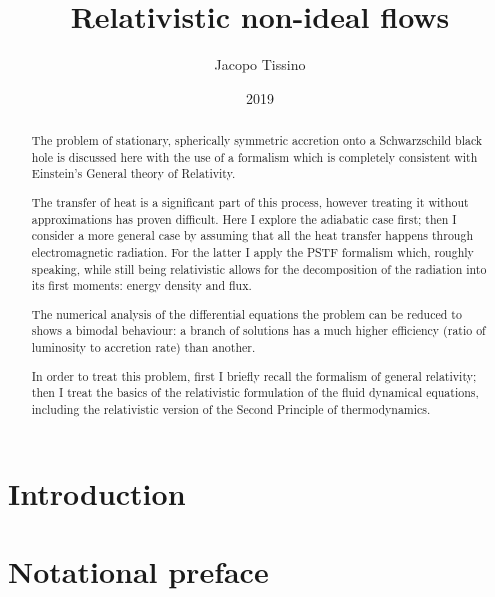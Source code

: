 \documentclass[a4paper, 11pt]{article}
\title{Relativistic non-ideal flows}
\author{Jacopo Tissino}
\date{2019}
\begin{document}



\begin{abstract}
The problem of stationary, spherically symmetric accretion onto a Schwarzschild black hole is discussed here with the use of a formalism which is completely consistent with Einstein's General theory of Relativity.

The transfer of heat is a significant part of this process, however treating it without approximations has proven difficult.
Here I explore the adiabatic case first; then I consider a more general case by assuming that all the heat transfer happens through electromagnetic radiation.
For the latter I apply the PSTF formalism which, roughly speaking, while still being relativistic allows for the decomposition of the radiation into its first moments: energy density and flux.

The numerical analysis of the differential equations the problem can be reduced to shows a bimodal behaviour: a branch of solutions has a much higher efficiency (ratio of luminosity to accretion rate) than another.

In order to treat this problem, first I briefly recall the formalism of general relativity; then I treat the basics of the relativistic formulation of the fluid dynamical equations, including the relativistic version of the Second Principle of thermodynamics.
\end{abstract}

\setcounter{tocdepth}{2}
\tableofcontents

\section{Introduction} \label{sec:introduction}


\section{Notational preface} \label{sec:notational-preface}

\end{document}
